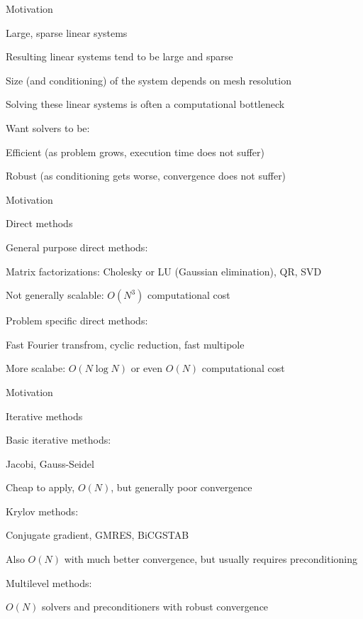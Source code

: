 \documentclass[18pt,xcolor=table]{beamer}
\begin{document}
\begin{frame}{Motivation}
\begin{block}{Large, sparse linear systems}
\bit
\item Resulting linear systems tend to be large and sparse
\item Size (and conditioning) of the system depends on mesh resolution
\item Solving these linear systems is often a computational bottleneck
\item Want solvers to be:
\bit
\item Efficient (as problem grows, execution time does not suffer)
\item Robust (as conditioning gets worse, convergence does not suffer)
\eit
\eit
\end{block}
\end{frame}

\begin{frame}{Motivation}
\begin{block}{Direct methods}
\bit
\item General purpose direct methods:
\bit
\item Matrix factorizations: Cholesky or LU (Gaussian elimination), QR, SVD 
\item Not generally scalable: $O(N^3)$ computational cost
\eit
\item Problem specific direct methods:
\bit
\item Fast Fourier transfrom, cyclic reduction, fast multipole
\item More scalabe: $O(N\log N)$ or even $O(N)$ computational cost
\eit
\eit
\end{block}
\end{frame}

\begin{frame}{Motivation}
\begin{block}{Iterative methods}
\bit
\item Basic iterative methods:
\bit
\item Jacobi, Gauss-Seidel
\item Cheap to apply, $O(N)$, but generally poor convergence
\eit
\item Krylov methods:
\bit
\item Conjugate gradient, GMRES, BiCGSTAB
\item Also $O(N)$ with much better convergence, but usually requires preconditioning
\eit
\item Multilevel methods:
\bit
\item $O(N)$ solvers and preconditioners with robust convergence 
\eit
\eit
\end{block}
\end{frame}
\end{document}
